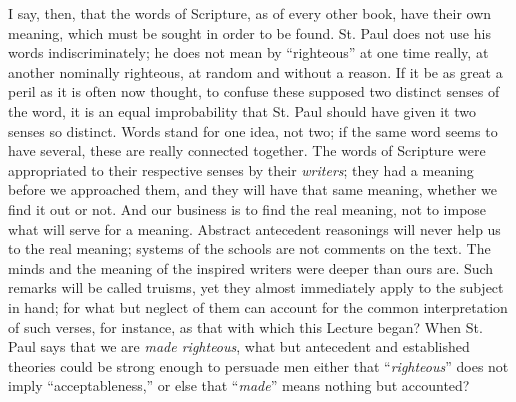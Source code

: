 I say, then, that the words of Scripture, as of every other book,
have their own meaning, which must be sought in order to be found. St.
Paul does not use his words indiscriminately; he does not mean by
``righteous'' at one time really, at another nominally
righteous, at random and without a reason. If it be as great a
peril as it is often now thought, to confuse these supposed two
distinct senses of the word, it is an equal improbability that St.
Paul should have given it two senses so distinct. Words stand for one
idea, not two; if the same word seems to have several, these are
really connected together. The words of Scripture were appropriated to
their respective senses by their \emph{writers}; they had a meaning
before we approached them, and they will have that same meaning,
whether we find it out or not. And our business is to find the real
meaning, not to impose what will serve for a meaning. Abstract
antecedent reasonings will never help us to the real meaning; systems
of the schools are not comments on the text. The minds and the meaning
of the inspired writers were deeper than ours are. Such remarks will
be called truisms, yet they almost immediately apply to the subject in
hand; for what but neglect of them can account for the common
interpretation of such verses, for instance, as that with which this
Lecture began? When St. Paul says that we are \emph{made righteous},
what but antecedent and established theories could be strong enough to
persuade men either that ``\emph{righteous}'' does not imply
``acceptableness,'' or else that ``\emph{made}'' means
nothing but accounted?

